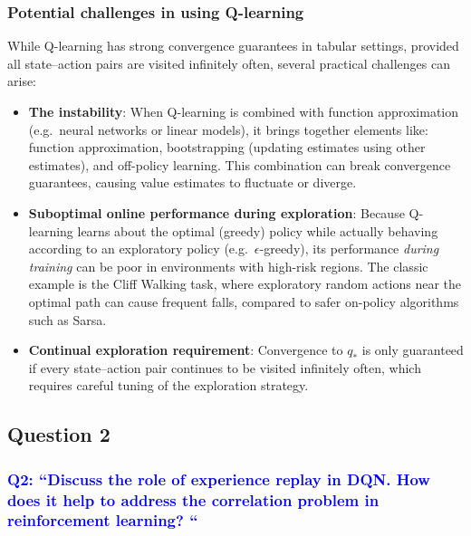 \documentclass{scrartcl}
\theoremstyle{mytheoremstyle}
\theoremstyle{mytheoremstyle}
\theoremstyle{myproblemstyle}
\begin{document}
\subsubsection{Potential challenges in using Q-learning}

While Q-learning has strong convergence guarantees in tabular settings, provided all state--action
pairs are visited infinitely often, several practical challenges can arise:

\begin{itemize}

    \item \textbf{The instability}: When Q-learning is combined with function
          approximation (e.g.\ neural networks or linear models), it brings together elements like: function approximation, bootstrapping (updating estimates using other
          estimates), and off-policy learning. This combination can break convergence guarantees, causing value estimates to fluctuate or diverge.

    \item \textbf{Suboptimal online performance during exploration}: Because Q-learning learns about
          the optimal (greedy) policy while actually behaving according to an exploratory policy (e.g.\
          $\epsilon$-greedy), its performance \emph{during training} can be poor in environments with
          high-risk regions. The classic example is the Cliff Walking task, where exploratory random actions
          near the optimal path can cause frequent falls, compared to safer on-policy algorithms such as
          Sarsa.

    \item \textbf{Continual exploration requirement}: Convergence to $q_*$ is only guaranteed if every
          state--action pair continues to be visited infinitely often, which requires careful tuning of the
          exploration strategy.

\end{itemize}

\subsection{Question 2}

\subsubsection*{\textcolor{blue}{Q2: ``Discuss the role of experience replay in DQN. How does it help to address the correlation problem in reinforcement learning? ``}}
\end{document}

